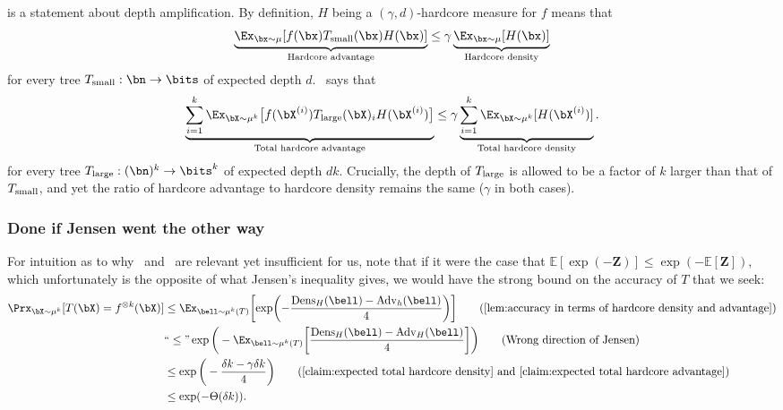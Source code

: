 \documentclass[11pt]{article}
\newcommand{\dens}{\mathrm{Dens}}
\newcommand{\adv}{\mathrm{Adv}}
\newcommand{\Dens}{\mathrm{Dens}}
\newcommand{\Adv}{\mathrm{Adv}}
\DeclarePairedDelimiter\paren{(}{)}
\DeclarePairedDelimiter\bracket{[}{]}
\begin{document}
 is a statement about depth amplification. By definition, $H$ being a $(\gamma,d)$-hardcore measure for $f$ means that 
    \begin{equation*}
        \underbrace{ \Ex_{\bx \sim \mu}[ f(\bx) T_{\textnormal{small}}(\bx) H(\bx)]}_{\textnormal{Hardcore advantage}}  \leq \gamma  \underbrace{\Ex_{\bx \sim \mu}[H(\bx)]}_{\textnormal{Hardcore density}}
    \end{equation*}
    for every tree $T_{\mathrm{small}} : \bn\to\bits$ of expected depth $d$.~ says that 
\[ \underbrace{\sum_{i=1}^k \Ex_{\bX\sim \mu^k}\big[ f(\bX^{(i)})T_{\textnormal{large}}(\bX)_i H(\bX^{(i)})\big] }_{\textnormal{Total hardcore advantage}} \le  \gamma   \underbrace{\sum_{i=1}^k \Ex_{\bX\sim\mu^k}[H(\bX^{(i)})]}_{ \textnormal{Total hardcore density}}. \]
for every tree $T_{\textnormal{large}} : (\bn)^k \to \bits^k$ of expected depth $dk$. Crucially, the depth of $T_{\textnormal{large}}$ is allowed to be a factor of $k$ larger than that of $T_{\textnormal{small}}$, and yet the ratio of hardcore advantage to hardcore density remains the same ($\gamma$ in both cases).  



\subsubsection{Done if Jensen went the other way}
\label{sec:jensen}
For intuition as to why~ and~ are relevant yet insufficient for us, note that if it were the case that $\mathbb{E}[\exp(-\boldsymbol{Z})] \le \exp(-\mathbb{E}[\boldsymbol{Z}])$, which unfortunately is the opposite of what Jensen’s inequality gives, we would have the strong bound on the accuracy of $T$ that we seek:   
\begin{align*}
 \Prx_{\bX \sim \mu^k}[T(\bX) = f^{\otimes k}(\bX)] &\leq \Ex_{\bell \sim \mu^k(T)}\bracket*{\exp\paren*{-\frac{\dens_H(\bell) - \adv_h(\bell)}{4}}} \tag{\Cref{lem:accuracy in terms of hardcore density and advantage}} \\
 &``\le" \exp\bigg(- \Ex_{\bell\sim\mu^k(T)}\bigg[\frac{\Dens_H(\bell)-\Adv_H(\bell)}{4}\bigg] \bigg) \tag{Wrong direction of Jensen} \\
 &\le \exp\bigg(-\frac{\delta k -\gamma \delta k}{4} \bigg)  \tag{\Cref{claim:expected total hardcore density} and \Cref{claim:expected total hardcore advantage}} \\
 &\le \exp(-\Theta(\delta k)). 
\end{align*}
\end{document}
